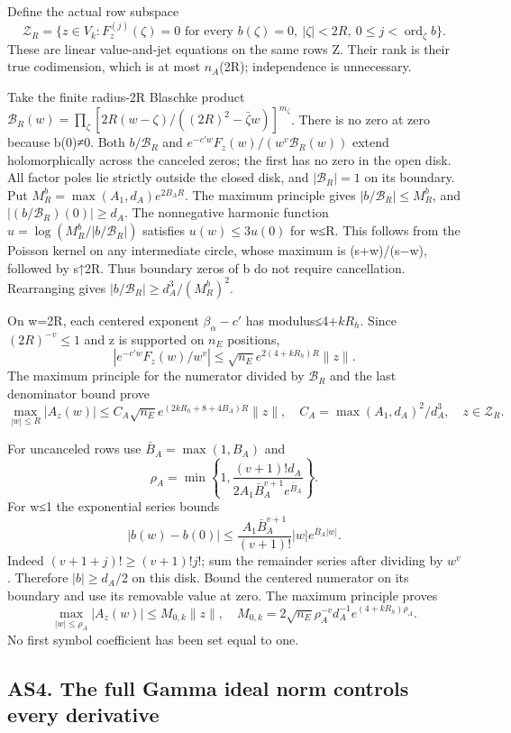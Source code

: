 \documentclass[11pt]{article}
\begin{document}
Define the actual row subspace \[
\mathcal Z_R=\{z\in V_k:F_z^{(j)}(\zeta)=0
\text{ for every }b(\zeta)=0,\ |\zeta|<2R,\ 0\le j<\operatorname{ord}_\zeta b\}.
\tag{AS13}
\] These are linear value-and-jet equations on the same rows Z. Their rank is their true codimension, which is at most \(n_A\)(2R); independence is unnecessary.

Take the finite radius-2R Blaschke product \(\mathcal B_R(w)=\prod_\zeta [2R(w-\zeta)/((2R)^2-\bar\zeta w)]^{m_\zeta}\). There is no zero at zero because b(0)≠0. Both \(b/\mathcal B_R\) and \(e^{-c'w}F_z(w)/(w^v\mathcal B_R(w))\) extend holomorphically across the canceled zeros; the first has no zero in the open disk. All factor poles lie strictly outside the closed disk, and \(|\mathcal B_R|=1\) on its boundary. Put \(M_R^b=\max(A_1,d_A)e^{2B_AR}\). The maximum principle gives \(|b/\mathcal B_R|\le M_R^b\), and \(|(b/\mathcal B_R)(0)|\ge d_A\). The nonnegative harmonic function \(u=\log(M_R^b/|b/\mathcal B_R|)\) satisfies \(u(w)\le3u(0)\) for \textbar w\textbar≤R. This follows from the Poisson kernel on any intermediate circle, whose maximum is (s+\textbar w\textbar)/(s−\textbar w\textbar), followed by s↑2R. Thus boundary zeros of b do not require cancellation. Rearranging gives \(|b/\mathcal B_R|\ge d_A^3/(M_R^b)^2\).

On \textbar w\textbar=2R, each centered exponent \(\beta_\alpha-c'\) has modulus≤4+\(kR_h\). Since \((2R)^{-v}\le1\) and z is supported on \(n_E\) positions, \[
|e^{-c'w}F_z(w)/w^v|
\le\sqrt{n_E}e^{2(4+kR_h)R}\|z\|.
\] The maximum principle for the numerator divided by \(\mathcal B_R\) and the last denominator bound prove \[
\max_{|w|\le R}|A_z(w)|
\le C_A\sqrt{n_E}e^{(2kR_h+8+4B_A)R}\|z\|,
\quad C_A=\max(A_1,d_A)^2/d_A^3,
\quad z\in\mathcal Z_R.
\tag{AS14}
\]

For uncanceled rows use \(\bar B_A=\max(1,B_A)\) and \[
\rho_A=\min\left\{1,
\frac{(v+1)!d_A}{2A_1\bar B_A^{v+1}e^{\bar B_A}}\right\}.
\tag{AS15}
\] For \textbar w\textbar≤1 the exponential series bounds \[
|b(w)-b(0)|\le
\frac{A_1\bar B_A^{v+1}}{(v+1)!}|w|e^{\bar B_A|w|}.
\] Indeed \((v+1+j)!\ge(v+1)!j!\); sum the remainder series after dividing by \(w^v\). Therefore \(|b|\ge d_A/2\) on this disk. Bound the centered numerator on its boundary and use its removable value at zero. The maximum principle proves \[
\max_{|w|\le\rho_A}|A_z(w)|\le M_{0,k}\|z\|,
\quad M_{0,k}=2\sqrt{n_E}\rho_A^{-v}d_A^{-1}
e^{(4+kR_h)\rho_A}.
\tag{AS16}
\] No first symbol coefficient has been set equal to one.

\subsection{AS4. The full Gamma ideal norm controls every derivative}\label{as4.-the-full-gamma-ideal-norm-controls-every-derivative}
\end{document}
